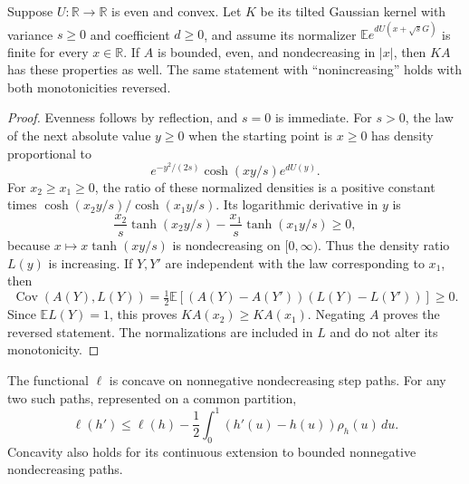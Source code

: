 \begin{lemma}
\label{var:folded-kernel}
Suppose $U:\mathbb R\to\mathbb R$ is even and convex. Let $K$ be
its tilted Gaussian kernel with variance $s\ge0$ and coefficient
$d\ge0$, and assume its normalizer
$\mathbb E e^{dU(x+\sqrt sG)}$ is finite for every $x\in\mathbb R$.
If $A$ is bounded, even, and nondecreasing in $|x|$, then $KA$
has these properties as well. The same statement with
``nonincreasing'' holds with both monotonicities reversed.
\end{lemma}

\begin{proof}
Evenness follows by reflection, and $s=0$ is immediate. For
$s>0$, the law of the next absolute value $y\ge0$ when the
starting point is $x\ge0$ has density proportional to
\[
 e^{-y^2/(2s)}\cosh(xy/s)e^{dU(y)}.
\]
For $x_2\ge x_1\ge0$, the ratio of these normalized densities
is a positive constant times
$\cosh(x_2y/s)/\cosh(x_1y/s)$. Its logarithmic derivative in
$y$ is
\[
 \frac{x_2}{s}\tanh(x_2y/s)
 -\frac{x_1}{s}\tanh(x_1y/s)\ge0,
\]
because $x\mapsto x\tanh(xy/s)$ is nondecreasing on
$[0,\infty)$. Thus the density ratio $L(y)$ is increasing.
If $Y,Y'$ are independent with the law corresponding to $x_1$,
then
\[
 \operatorname{Cov}(A(Y),L(Y))
 =\tfrac12\mathbb E[(A(Y)-A(Y'))(L(Y)-L(Y'))]\ge0.
\]
Since $\mathbb E L(Y)=1$, this proves
$K A(x_2)\ge K A(x_1)$. Negating $A$ proves the reversed
statement. The normalizations are included in $L$ and do not
alter its monotonicity.
\end{proof}

\begin{theorem}
\label{var:concavity}
The functional $\ell$ is concave on nonnegative nondecreasing
step paths. For any two such paths, represented on a common
partition,
\begin{equation}
\label{var:support}
 \ell(h')\le\ell(h)
      -\frac12\int_0^1(h'(u)-h(u))\rho_h(u)\,du.
\end{equation}
Concavity also holds for its continuous extension to bounded
nonnegative nondecreasing paths.
\end{theorem}

